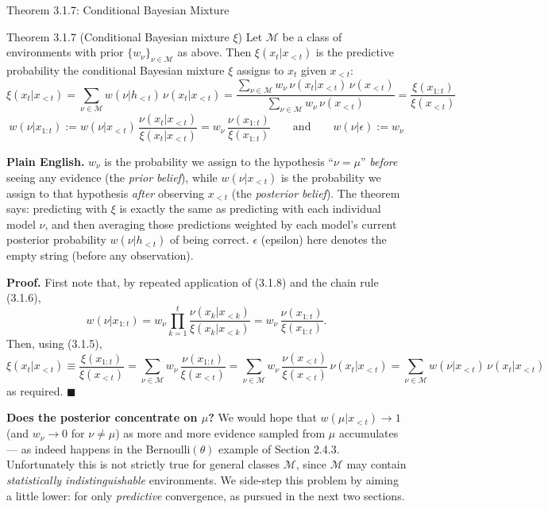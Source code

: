 \documentclass[aspectratio=169,10pt]{beamer}
\newcommand{\Mcal}{\mathcal{M}}
\begin{document}
\begin{frame}[allowframebreaks]{Theorem 3.1.7: Conditional Bayesian Mixture}
  \begin{block}{Theorem 3.1.7 (Conditional Bayesian mixture $\xi$)}
    Let $\Mcal$ be a class of environments with prior $\{w_\nu\}_{\nu\in\Mcal}$
    as above. Then $\xi(x_t|x_{<t})$ is the predictive probability the
    conditional Bayesian mixture $\xi$ assigns to $x_t$ given $x_{<t}$:
    \[
      \xi(x_t|x_{<t}) = \sum_{\nu\in\Mcal} w(\nu|h_{<t})\,\nu(x_t|x_{<t})
      = \frac{\sum_{\nu\in\Mcal} w_\nu\,\nu(x_t|x_{<t})\,\nu(x_{<t})}
             {\sum_{\nu\in\Mcal} w_\nu\,\nu(x_{<t})}
      = \frac{\xi(x_{1:t})}{\xi(x_{<t})}
    \]
    \[
      w(\nu|x_{1:t}) := w(\nu|x_{<t})\,\frac{\nu(x_t|x_{<t})}{\xi(x_t|x_{<t})}
      = w_\nu\,\frac{\nu(x_{1:t})}{\xi(x_{1:t})}
      \qquad \text{and} \qquad w(\nu|\epsilon) := w_\nu \tag{3.1.8}
    \]
  \end{block}
  \textbf{Plain English.} $w_\nu$ is the probability we assign to the
  hypothesis ``$\nu=\mu$'' \emph{before} seeing any evidence (the
  \emph{prior belief}), while $w(\nu|x_{<t})$ is the probability we assign
  to that hypothesis \emph{after} observing $x_{<t}$ (the \emph{posterior
  belief}). The theorem says: predicting with $\xi$ is exactly the same as
  predicting with each individual model $\nu$, and then averaging those
  predictions weighted by each model's current posterior probability
  $w(\nu|h_{<t})$ of being correct. $\epsilon$ (epsilon) here denotes the
  empty string (before any observation).

  \framebreak
  \textbf{Proof.} First note that, by repeated application of (3.1.8) and the
  chain rule (3.1.6),
  \[
    w(\nu|x_{1:t}) = w_\nu \prod_{k=1}^{t} \frac{\nu(x_k|x_{<k})}{\xi(x_k|x_{<k})}
    = w_\nu\,\frac{\nu(x_{1:t})}{\xi(x_{1:t})}.
  \]
  Then, using (3.1.5),
  \[
    \xi(x_t|x_{<t}) \equiv \frac{\xi(x_{1:t})}{\xi(x_{<t})}
    = \sum_{\nu\in\Mcal} w_\nu\,\frac{\nu(x_{1:t})}{\xi(x_{<t})}
    = \sum_{\nu\in\Mcal} w_\nu\,\frac{\nu(x_{<t})}{\xi(x_{<t})}\,\nu(x_t|x_{<t})
    = \sum_{\nu\in\Mcal} w(\nu|x_{<t})\,\nu(x_t|x_{<t})
  \]
  as required. $\blacksquare$

  \vspace{2mm}
  \textbf{Does the posterior concentrate on $\mu$?} We would hope that
  $w(\mu|x_{<t}) \to 1$ (and $w_\nu \to 0$ for $\nu \neq \mu$) as more and more
  evidence sampled from $\mu$ accumulates --- as indeed happens in the
  Bernoulli$(\theta)$ example of Section 2.4.3. Unfortunately this is not
  strictly true for general classes $\Mcal$, since $\Mcal$ may contain
  \emph{statistically indistinguishable} environments. We side-step this
  problem by aiming a little lower: for only \emph{predictive} convergence,
  as pursued in the next two sections.
\end{frame}
\end{document}
